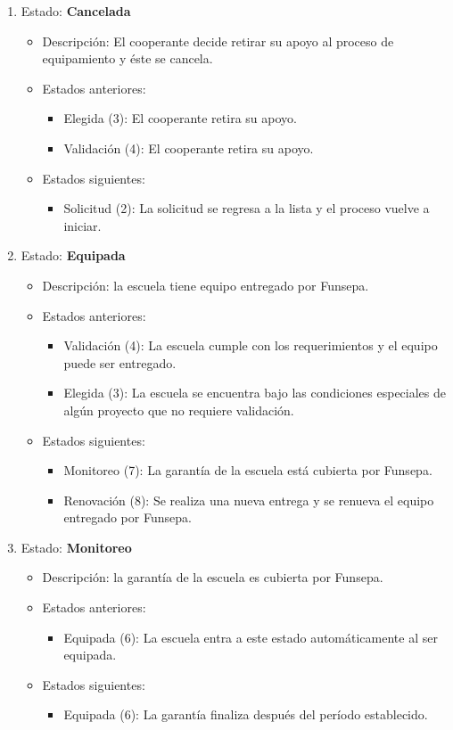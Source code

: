 \documentclass[11pt]{report}
\begin{document}
\begin{enumerate}
		\item Estado: \textbf{Cancelada}
		\begin{itemize}
			\item Descripción: El cooperante decide retirar su apoyo al proceso de equipamiento y éste se cancela.
			\item Estados anteriores:
			\begin{itemize}
				\item Elegida (3): El cooperante retira su apoyo.
				\item Validación (4): El cooperante retira su apoyo.
			\end{itemize}
			\item Estados siguientes:
			\begin{itemize}
				\item Solicitud (2): La solicitud se regresa a la lista y el proceso vuelve a iniciar.
			\end{itemize}
		\end{itemize}
		
		\item Estado: \textbf{Equipada}
		\begin{itemize}
			\item Descripción: la escuela tiene equipo entregado por Funsepa.
			\item Estados anteriores:
			\begin{itemize}
				\item Validación (4): La escuela cumple con los requerimientos y el equipo puede ser entregado.
				\item Elegida (3): La escuela se encuentra bajo las condiciones especiales de algún proyecto que no requiere validación.
			\end{itemize}
			\item Estados siguientes:
			\begin{itemize}
				\item Monitoreo (7): La garantía de la escuela está cubierta por Funsepa.
				\item Renovación (8): Se realiza una nueva entrega y se renueva el equipo entregado por Funsepa.
			\end{itemize}
		\end{itemize}
		
		\item Estado: \textbf{Monitoreo}
		\begin{itemize}
			\item Descripción: la garantía de la escuela es cubierta por Funsepa.
			\item Estados anteriores:
			\begin{itemize}
				\item Equipada (6): La escuela entra a este estado automáticamente al ser equipada.
			\end{itemize}
			\item Estados siguientes:
			\begin{itemize}
				\item Equipada (6): La garantía finaliza después del período establecido.
			\end{itemize}
		\end{itemize}
		

\end{enumerate}
\end{document}
